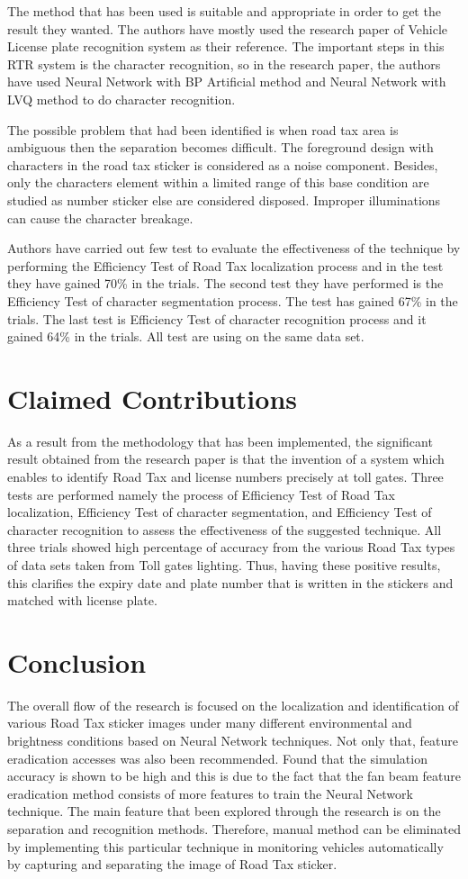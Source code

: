 \documentclass[12pt]{article}
\begin{document}
The method that has been used is suitable and appropriate in order to get the result they wanted. The authors have mostly used the research paper of Vehicle License plate recognition system as their reference. The important steps in this RTR system is the character recognition, so in the research paper, the authors have used Neural Network with BP Artificial method and Neural Network with LVQ method to do character recognition.  

The possible problem that had been identified is when road tax area is ambiguous then the separation becomes difficult. The foreground design with characters in the road tax sticker is considered as a noise component. Besides, only the characters element within a limited range of this base condition are studied as number sticker else are considered disposed. Improper illuminations can cause the character breakage.

Authors have carried out few test to evaluate the effectiveness of the technique by performing the Efficiency Test of Road Tax localization process and in the test they have gained 70\% in the trials. The second test they have performed is the Efficiency Test of character segmentation process. The test has gained 67\% in the trials. The last test is Efficiency Test of character recognition process and it gained 64\% in the trials. All test are using on the same data set.

\section{Claimed Contributions}
As a result from the methodology that has been implemented, the significant result obtained from the research paper is that the invention of a system which enables to identify Road Tax and license numbers precisely at toll gates. Three tests are performed namely the process of Efficiency Test of Road Tax localization, Efficiency Test of character segmentation, and Efficiency Test of character recognition to assess the effectiveness of the suggested technique. All three trials showed high percentage of accuracy from the various Road Tax types of data sets taken from Toll gates lighting. Thus, having these positive results, this clarifies the expiry date and plate number that is written in the stickers and matched with license plate.
\section{Conclusion}
The overall flow of the research is focused on the localization and identification of various Road Tax sticker images under many different environmental and brightness conditions based on Neural Network techniques. Not only that, feature eradication accesses was also been recommended. Found that the simulation accuracy is shown to be high and this is due to the fact that the fan beam feature eradication method consists of more features to train the Neural Network technique. The main feature that been explored through the research is on the separation and recognition methods. Therefore, manual method can be eliminated by implementing this particular technique in monitoring vehicles automatically by capturing and separating the image of Road Tax sticker.
\end{document}
